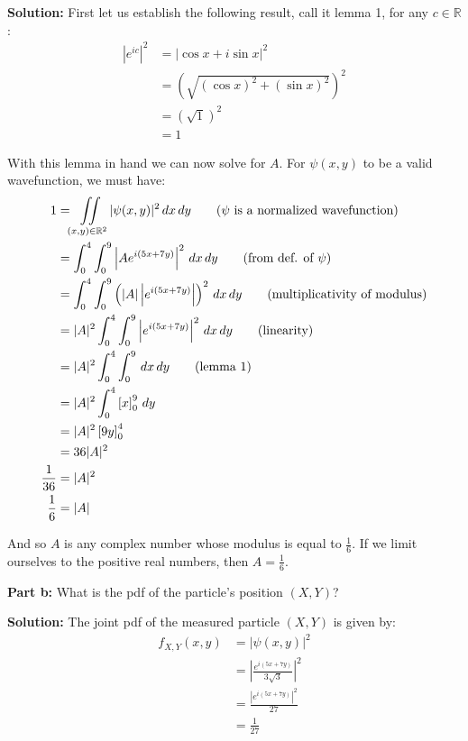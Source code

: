 \documentclass{article}
\renewcommand{\eval}[3]{\left[#1\right]_{#2}^{#3}}
\begin{document}
\noindent\textbf{Solution:} First let us establish the following result, call it lemma 1, for any $c\in\mathbb R$:
\begin{align*}
    |e^{ic}|^2&=|\cos x+i\sin x|^2\tag{Euler's formula}\\
    &=\left(\sqrt{(\cos x)^2+(\sin x)^2}\right)^2\tag{def. of modulus}\\
    &=\left(\sqrt{1}\right)^2\tag{trig identity}\\
    &=1
\end{align*}

With this lemma in hand we can now solve for $A$. For $\psi(x,y)$ to be a valid wavefunction, we must have:
\begin{align*}
    1&=\iint\displaylimits_{(x,y)\in\mathbb R^2}|\psi(x,y)|^2\,dx\,dy\tag{$\psi$ is a normalized wavefunction}\\
    &=\int_0^4\int_0^9\left|Ae^{i(5x+7y)}\right|^2\,dx\,dy\tag{from def. of $\psi$}\\
    &=\int_0^4\int_0^9\left(|A|\left|e^{i(5x+7y)}\right|\right)^2\,dx\,dy\tag{multiplicativity of modulus}\\
    &=|A|^2\int_0^4\int_0^9\left|e^{i(5x+7y)}\right|^2\,dx\,dy\tag{linearity}\\
    &=|A|^2\int_0^4\int_0^9\,dx\,dy\tag{lemma 1}\\
    &=|A|^2\int_0^4\eval{x}{0}{9}\,dy\\
    &=|A|^2\eval{9y}{0}{4}\\
    &=36|A|^2\\
    \frac{1}{36}&=|A|^2\\
    \frac{1}{6}&=|A|
\end{align*}

And so $A$ is any complex number whose modulus is equal to $\frac{1}{6}$. If we limit ourselves to the positive real numbers, then $A=\frac{1}{6}$.
\bigskip
\newpage

\noindent\textbf{Part b:} What is the pdf of the particle's position $(X,Y)$?
\bigskip

\noindent\textbf{Solution:} The joint pdf of the measured particle $(X,Y)$ is given by:
\begin{align*}
    f_{X,Y}(x,y)&=|\psi(x,y)|^2\\
    &=\left|\frac{e^{i(5x+7y)}}{3\sqrt 3}\right|^2\\
    &=\frac{\left|e^{i(5x+7y)}\right|^2}{27}\\
    &=\frac{1}{27}\tag{lemma 1}
\end{align*}
\end{document}
